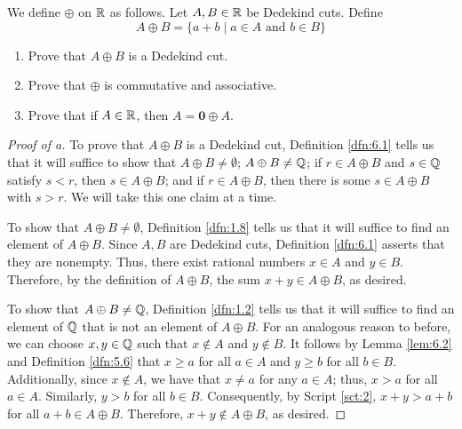 \documentclass[../main.tex]{subfiles}
\begin{document}

\begin{definition}\label{dfn:7.31}
    We define $\oplus$ on $\mathbb{R}$ as follows. Let $A,B\in\mathbb{R}$ be Dedekind cuts. Define
    \begin{equation*}
        A\oplus B = \{a+b\mid a\in A\text{ and }b\in B\}
    \end{equation*}
\end{definition}

\begin{exercise}\label{exr:7.32}\leavevmode
    \begin{enumerate}[label={(\alph*)},ref={\theexercise\alph*}]
        \item \label{exr:7.32a}Prove that $A\oplus B$ is a Dedekind cut.
        \item \label{exr:7.32b}Prove that $\oplus$ is commutative and associative.
        \item \label{exr:7.32c}Prove that if $A\in\mathbb{R}$, then $A=\bm{0}\oplus A$.
    \end{enumerate}
    \begin{proof}[Proof of a]
        To prove that $A\oplus B$ is a Dedekind cut, Definition \ref{dfn:6.1} tells us that it will suffice to show that $A\oplus B\neq\emptyset$; $A\oplus B\neq\mathbb{Q}$; if $r\in A\oplus B$ and $s\in\mathbb{Q}$ satisfy $s<r$, then $s\in A\oplus B$; and if $r\in A\oplus B$, then there is some $s\in A\oplus B$ with $s>r$. We will take this one claim at a time.\par
        To show that $A\oplus B\neq\emptyset$, Definition \ref{dfn:1.8} tells us that it will suffice to find an element of $A\oplus B$. Since $A,B$ are Dedekind cuts, Definition \ref{dfn:6.1} asserts that they are nonempty. Thus, there exist rational numbers $x\in A$ and $y\in B$. Therefore, by the definition of $A\oplus B$, the sum $x+y\in A\oplus B$, as desired.\par
        To show that $A\oplus B\neq\mathbb{Q}$, Definition \ref{dfn:1.2} tells us that it will suffice to find an element of $\mathbb{Q}$ that is not an element of $A\oplus B$. For an analogous reason to before, we can choose $x,y\in\mathbb{Q}$ such that $x\notin A$ and $y\notin B$. It follows by Lemma \ref{lem:6.2} and Definition \ref{dfn:5.6} that $x\geq a$ for all $a\in A$ and $y\geq b$ for all $b\in B$. Additionally, since $x\notin A$, we have that $x\neq a$ for any $a\in A$; thus, $x>a$ for all $a\in A$. Similarly, $y>b$ for all $b\in B$. Consequently, by Script \ref{sct:2}, $x+y>a+b$ for all $a+b\in A\oplus B$. Therefore, $x+y\notin A\oplus B$, as desired.\par

\end{proof}
\end{exercise}
\end{document}
